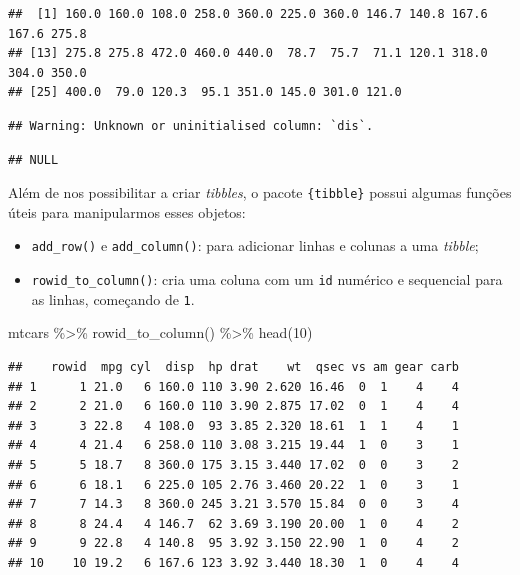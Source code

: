 \documentclass[
]{book}
\newenvironment{Shaded}{\begin{snugshade}}{\end{snugshade}}
\newcommand{\CommentTok}[1]{\textcolor[rgb]{0.56,0.35,0.01}{\textit{#1}}}
\newcommand{\DecValTok}[1]{\textcolor[rgb]{0.00,0.00,0.81}{#1}}
\newcommand{\FunctionTok}[1]{\textcolor[rgb]{0.00,0.00,0.00}{#1}}
\newcommand{\NormalTok}[1]{#1}
\newcommand{\OtherTok}[1]{\textcolor[rgb]{0.56,0.35,0.01}{#1}}
\newcommand{\SpecialCharTok}[1]{\textcolor[rgb]{0.00,0.00,0.00}{#1}}
\begin{document}
\begin{verbatim}
##  [1] 160.0 160.0 108.0 258.0 360.0 225.0 360.0 146.7 140.8 167.6 167.6 275.8
## [13] 275.8 275.8 472.0 460.0 440.0  78.7  75.7  71.1 120.1 318.0 304.0 350.0
## [25] 400.0  79.0 120.3  95.1 351.0 145.0 301.0 121.0
\end{verbatim}

\begin{Shaded}
\end{Shaded}

\begin{verbatim}
## Warning: Unknown or uninitialised column: `dis`.
\end{verbatim}

\begin{verbatim}
## NULL
\end{verbatim}

Além de nos possibilitar a criar \emph{tibbles}, o pacote \texttt{\{tibble\}} possui algumas funções úteis para manipularmos esses objetos:

\begin{itemize}
\item
  \texttt{add\_row()} e \texttt{add\_column()}: para adicionar linhas e colunas a uma \emph{tibble};
\item
  \texttt{rowid\_to\_column()}: cria uma coluna com um \texttt{id} numérico e sequencial para as linhas, começando de \texttt{1}.
\end{itemize}

\begin{Shaded}
\begin{Highlighting}[]
\NormalTok{mtcars }\SpecialCharTok{\%\textgreater{}\%} 
  \FunctionTok{rowid\_to\_column}\NormalTok{() }\SpecialCharTok{\%\textgreater{}\%} 
  \FunctionTok{head}\NormalTok{(}\DecValTok{10}\NormalTok{)}
\end{Highlighting}
\end{Shaded}

\begin{verbatim}
##    rowid  mpg cyl  disp  hp drat    wt  qsec vs am gear carb
## 1      1 21.0   6 160.0 110 3.90 2.620 16.46  0  1    4    4
## 2      2 21.0   6 160.0 110 3.90 2.875 17.02  0  1    4    4
## 3      3 22.8   4 108.0  93 3.85 2.320 18.61  1  1    4    1
## 4      4 21.4   6 258.0 110 3.08 3.215 19.44  1  0    3    1
## 5      5 18.7   8 360.0 175 3.15 3.440 17.02  0  0    3    2
## 6      6 18.1   6 225.0 105 2.76 3.460 20.22  1  0    3    1
## 7      7 14.3   8 360.0 245 3.21 3.570 15.84  0  0    3    4
## 8      8 24.4   4 146.7  62 3.69 3.190 20.00  1  0    4    2
## 9      9 22.8   4 140.8  95 3.92 3.150 22.90  1  0    4    2
## 10    10 19.2   6 167.6 123 3.92 3.440 18.30  1  0    4    4
\end{verbatim}
\end{document}
